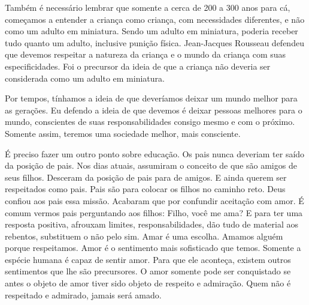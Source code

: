 \emdash{}Também é necessário lembrar que somente a cerca de 200 a 300 anos para cá, começamos a entender a criança como criança, com necessidades diferentes, e não como um adulto em miniatura. Sendo um adulto em miniatura, poderia receber tudo quanto um adulto, inclusive punição física. Jean-Jacques Rousseau defendeu que devemos respeitar a natureza da criança e o mundo da criança com suas especificidades. Foi o precursor da ideia de que a criança não deveria ser considerada como um adulto em miniatura.

\emdash{}Por tempos, tínhamos a ideia de que deveríamos deixar um mundo melhor para as gerações. Eu defendo a ideia de que devemos é deixar pessoas melhores para o mundo, conscientes de suas responsabilidades consigo mesmo e com o próximo. Somente assim, teremos uma sociedade melhor, mais consciente.

\emdash{}É preciso fazer um outro ponto sobre educação. Os pais nunca deveriam ter saído da posição de pais. Nos dias atuais, assumiram o conceito de que são amigos de seus filhos. Desceram da posição de pais para de amigos. E ainda querem ser respeitados como pais. Pais são para colocar os filhos no caminho reto. Deus confiou aos pais essa missão. Acabaram que por confundir aceitação com amor. É comum vermos pais perguntando aos filhos: Filho, você me ama? E para ter uma resposta positiva, afrouxam limites, responsabilidades, dão tudo de material aos rebentos, substituem o não pelo sim. Amar é uma escolha. Amamos alguém porque respeitamos. Amor é o sentimento mais sofisticado que temos. Somente a espécie humana é capaz de sentir amor. Para que ele aconteça, existem outros sentimentos que lhe são precursores. O amor somente pode ser conquistado se antes o objeto de amor tiver sido objeto de respeito e admiração. Quem não é respeitado e admirado, jamais será amado. 